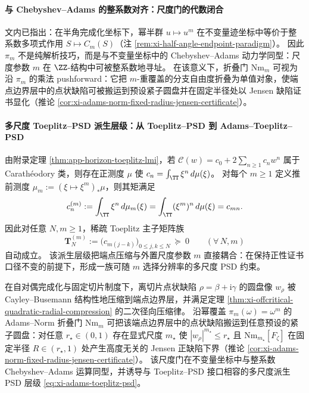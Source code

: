 \paragraph{与 Chebyshev--Adams 的整系数对齐：尺度门的代数闭合}
文内已指出：在半角完成化坐标下，幂半群 \(u\mapsto u^m\) 在不变量迹坐标中等价于整系数多项式作用 \(S\mapsto C_m(S)\)（注 \ref{rem:xi-half-angle-endpoint-paradigm}）。
因此 \(\pi_m\) 不是纯解析技巧，而是与不变量坐标中的 Chebyshev--Adams 动力学同型：尺度参数 \(m\) 在 \(\ZZ\)-结构中可被整系数地寻址。
在该意义下，折叠门 \(\mathrm{Nm}_m\) 可视为沿 \(\pi_m\) 的乘法 pushforward：它把 \(m\)-重覆盖的分支自由度折叠为单值对象，使端点边界层中的点状缺陷可被搬运到预设紧子圆盘并在固定半径处以 Jensen 缺陷证书显化（推论 \ref{cor:xi-adams-norm-fixed-radius-jensen-certificate}）。

\paragraph{多尺度 Toeplitz--PSD 派生层级：从 Toeplitz--PSD 到 Adams--Toeplitz--PSD}
由附录定理 \ref{thm:app-horizon-toeplitz-lmi}，若 \(\mathscr{C}(w)=c_0+2\sum_{n\ge 1}c_n w^n\) 属于 Carath\'eodory 类，则存在正测度 \(\mu\) 使
\(
c_n=\int_{\TT}\xi^n\,d\mu(\xi)
\)。
对每个 \(m\ge 1\) 定义推前测度 \(\mu_m:=(\xi\mapsto \xi^m)_*\mu\)，则其矩满足
\[
c^{(m)}_n:=\int_{\TT}\xi^n\,d\mu_m(\xi)=\int_{\TT}(\xi^m)^n\,d\mu(\xi)=c_{mn}.
\]
因此对任意 \(N,m\ge 1\)，稀疏 Toeplitz 主子矩阵族
\begin{equation}\label{eq:xi-adams-toeplitz-psd}
\boxed{\;
\mathbf{T}^{(m)}_N
:=\bigl(c_{m(j-k)}\bigr)_{0\le j,k\le N}\ \succeq\ 0\qquad(\forall\,N,m)\;}
\end{equation}
自动成立。
该派生层级把端点压缩与外置尺度参数 \(m\) 直接耦合：在保持正性证书口径不变的前提下，形成一族可随 \(m\) 选择分辨率的多尺度 PSD 约束。

\begin{theorem}\label{thm:xi-symmetry-audit-tension-scaled}
在自对偶完成化与固定切片制度下，离切片点状缺陷 \(\rho=\beta+\mathrm{i}\gamma\) 的圆盘像 \(w_\rho\) 被 Cayley--Busemann 结构性地压缩到端点边界层，并满足定理 \ref{thm:xi-offcritical-quadratic-radial-compression} 的二次径向压缩律。
沿幂覆盖 \(\pi_m(\omega)=\omega^m\) 的 Adams--Norm 折叠门 \(\mathrm{Nm}_m\) 可把该端点边界层中的点状缺陷搬运到任意预设的紧子圆盘：对任意 \(r_\star\in(0,1)\) 存在显式尺度 \(m_\star\) 使 \(|w_\rho|^{m_\star}\le r_\star\) 且 \(\mathrm{Nm}_{m_\star}[F_\zeta]\) 在固定半径 \(R\in(r_\star,1)\) 处产生高度无关的 Jensen 正缺陷下界（推论 \ref{cor:xi-adams-norm-fixed-radius-jensen-certificate}）。
该尺度门在不变量坐标中与整系数 Chebyshev--Adams 运算同型，并诱导与 Toeplitz--PSD 接口相容的多尺度派生 PSD 层级 \eqref{eq:xi-adams-toeplitz-psd}。
\end{theorem}

